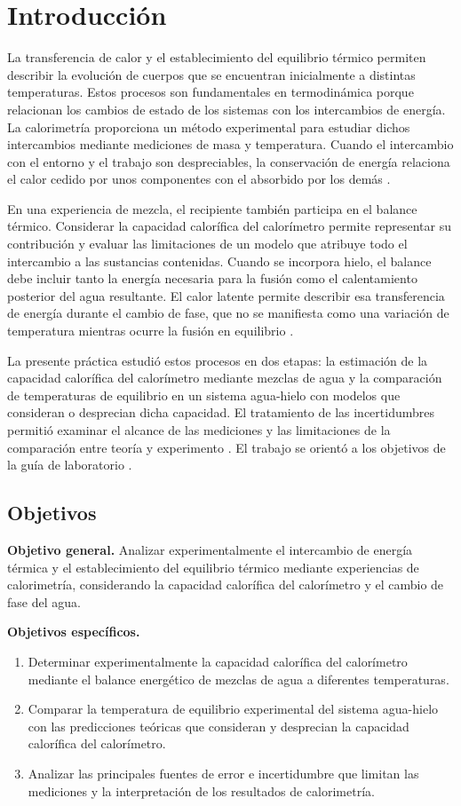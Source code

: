 \section{Introducción}
La transferencia de calor y el establecimiento del equilibrio térmico permiten describir la evolución de cuerpos que se encuentran inicialmente a distintas temperaturas. Estos procesos son fundamentales en termodinámica porque relacionan los cambios de estado de los sistemas con los intercambios de energía. La calorimetría proporciona un método experimental para estudiar dichos intercambios mediante mediciones de masa y temperatura. Cuando el intercambio con el entorno y el trabajo son despreciables, la conservación de energía relaciona el calor cedido por unos componentes con el absorbido por los demás \cite{serway}.

En una experiencia de mezcla, el recipiente también participa en el balance térmico. Considerar la capacidad calorífica del calorímetro permite representar su contribución y evaluar las limitaciones de un modelo que atribuye todo el intercambio a las sustancias contenidas. Cuando se incorpora hielo, el balance debe incluir tanto la energía necesaria para la fusión como el calentamiento posterior del agua resultante. El calor latente permite describir esa transferencia de energía durante el cambio de fase, que no se manifiesta como una variación de temperatura mientras ocurre la fusión en equilibrio \cite{serway}.

La presente práctica estudió estos procesos en dos etapas: la estimación de la capacidad calorífica del calorímetro mediante mezclas de agua y la comparación de temperaturas de equilibrio en un sistema agua-hielo con modelos que consideran o desprecian dicha capacidad. El tratamiento de las incertidumbres permitió examinar el alcance de las mediciones y las limitaciones de la comparación entre teoría y experimento \cite{taylor}. El trabajo se orientó a los objetivos de la guía de laboratorio \cite{guiauca4}.

\subsection{Objetivos}
\textbf{Objetivo general.} Analizar experimentalmente el intercambio de energía térmica y el establecimiento del equilibrio térmico mediante experiencias de calorimetría, considerando la capacidad calorífica del calorímetro y el cambio de fase del agua.

\textbf{Objetivos específicos.}
\begin{enumerate}
  \item Determinar experimentalmente la capacidad calorífica del calorímetro mediante el balance energético de mezclas de agua a diferentes temperaturas.
  \item Comparar la temperatura de equilibrio experimental del sistema agua-hielo con las predicciones teóricas que consideran y desprecian la capacidad calorífica del calorímetro.
  \item Analizar las principales fuentes de error e incertidumbre que limitan las mediciones y la interpretación de los resultados de calorimetría.
\end{enumerate}
